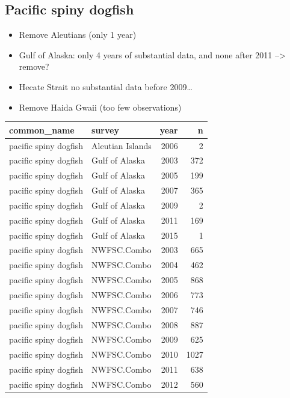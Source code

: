 \documentclass[
  letterpaper,
  DIV=11,
  numbers=noendperiod]{scrartcl}
\providecommand{\tightlist}{%
  \setlength{\itemsep}{0pt}\setlength{\parskip}{0pt}}\usepackage{longtable,booktabs,array}
\begin{document}
\subsection{Pacific spiny dogfish}\label{pacific-spiny-dogfish}

\begin{itemize}
\tightlist
\item
  Remove Aleutians (only 1 year)
\item
  Gulf of Alaska: only 4 years of substantial data, and none after 2011
  --\textgreater{} remove?
\item
  Hecate Strait no substantial data before 2009\ldots{}
\item
  Remove Haida Gwaii (too few observations)
\end{itemize}

\begin{tabular}[t]{l|l|r|r}
\hline
common\_name & survey & year & n\\
\hline
pacific spiny dogfish & Aleutian Islands & 2006 & 2\\
\hline
pacific spiny dogfish & Gulf of Alaska & 2003 & 372\\
\hline
pacific spiny dogfish & Gulf of Alaska & 2005 & 199\\
\hline
pacific spiny dogfish & Gulf of Alaska & 2007 & 365\\
\hline
pacific spiny dogfish & Gulf of Alaska & 2009 & 2\\
\hline
pacific spiny dogfish & Gulf of Alaska & 2011 & 169\\
\hline
pacific spiny dogfish & Gulf of Alaska & 2015 & 1\\
\hline
pacific spiny dogfish & NWFSC.Combo & 2003 & 665\\
\hline
pacific spiny dogfish & NWFSC.Combo & 2004 & 462\\
\hline
pacific spiny dogfish & NWFSC.Combo & 2005 & 868\\
\hline
pacific spiny dogfish & NWFSC.Combo & 2006 & 773\\
\hline
pacific spiny dogfish & NWFSC.Combo & 2007 & 746\\
\hline
pacific spiny dogfish & NWFSC.Combo & 2008 & 887\\
\hline
pacific spiny dogfish & NWFSC.Combo & 2009 & 625\\
\hline
pacific spiny dogfish & NWFSC.Combo & 2010 & 1027\\
\hline
pacific spiny dogfish & NWFSC.Combo & 2011 & 638\\
\hline
pacific spiny dogfish & NWFSC.Combo & 2012 & 560\\

\end{tabular}
\end{document}
